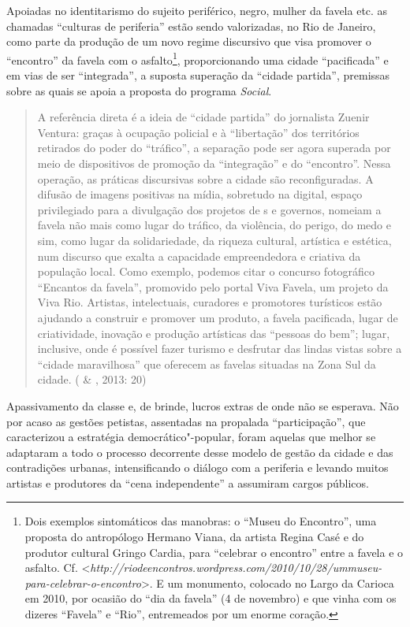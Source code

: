 Apoiadas no identitarismo do sujeito periférico, negro, mulher da favela
etc. as chamadas ``culturas de periferia'' estão sendo valorizadas, no
Rio de Janeiro, como parte da produção de um novo regime discursivo que
visa promover o ``encontro'' da favela com o asfalto\footnote{Dois
  exemplos sintomáticos das manobras: o ``Museu do Encontro'', uma
  proposta do antropólogo Hermano Viana, da artista Regina Casé e do
  produtor cultural Gringo Cardia, para ``celebrar o encontro'' entre a
  favela e o asfalto. Cf.
  \textless{}\emph{http://riodeencontros.wordpress.com/2010/10/28/ummuseu-para-celebrar-o-encontro}\textgreater{}.
  E um monumento, colocado no Largo da Carioca em 2010, por ocasião do
  ``dia da favela'' (4 de novembro) e que vinha com os dizeres
  ``Favela'' e ``Rio'', entremeados por um enorme coração.},
proporcionando uma cidade ``pacificada'' e em vias de ser ``integrada'',
a suposta superação da ``cidade partida'', premissas sobre as quais se
apoia a proposta do programa \emph{ Social}.

\begin{quote}
A referência direta é a ideia de ``cidade partida'' do jornalista Zuenir
Ventura: graças à ocupação policial e à ``libertação'' dos territórios
retirados do poder do ``tráfico'', a separação pode ser agora superada
por meio de dispositivos de promoção da ``integração'' e do
``encontro''. Nessa operação, as práticas discursivas sobre a cidade são
reconfiguradas. A difusão de imagens positivas na mídia, sobretudo na
digital, espaço privilegiado para a divulgação dos projetos de s e
governos, nomeiam a favela não mais como lugar do tráfico, da violência,
do perigo, do medo e sim, como lugar da solidariedade, da riqueza
cultural, artística e estética, num discurso que exalta a capacidade
empreendedora e criativa da população local. Como exemplo, podemos citar
o concurso fotográfico ``Encantos da favela'', promovido pelo portal
Viva Favela, um projeto da  Viva Rio. Artistas, intelectuais,
curadores e promotores turísticos estão ajudando a construir e promover
um produto, a favela pacificada, lugar de criatividade, inovação e
produção artísticas das ``pessoas do bem''; lugar, inclusive, onde é
possível fazer turismo e desfrutar das lindas vistas sobre a ``cidade
maravilhosa'' que oferecem as favelas situadas na Zona Sul da cidade.
( \& , 2013: 20)
\end{quote}

Apassivamento da classe e, de brinde, lucros extras de onde não se
esperava. Não por acaso as gestões petistas, assentadas na propalada
``participação'', que caracterizou a estratégia democrático"-popular,
foram aquelas que melhor se adaptaram a todo o processo decorrente desse
modelo de gestão da cidade e das contradições urbanas, intensificando o
diálogo com a periferia e levando muitos artistas e produtores da ``cena
independente'' a assumiram cargos públicos.

